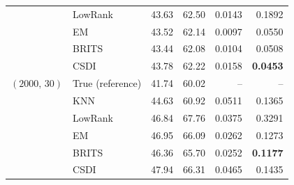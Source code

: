 \begin{table}[htbp]
\begin{tabular}{llrrrr}
     & LowRank & 43.63 & 62.50 & 0.0143 & 0.1892 \\
     & EM & 43.52 & 62.14 & 0.0097 & 0.0550 \\
     & BRITS & 43.44 & 62.08 & 0.0104 & 0.0508 \\
     & CSDI & 43.78 & 62.22 & 0.0158 & \textbf{0.0453} \\
    \midrule
    $(2000,\, 30)$ & True (reference) & 41.74 & 60.02 & -- & -- \\
     & KNN & 44.63 & 60.92 & 0.0511 & 0.1365 \\
     & LowRank & 46.84 & 67.76 & 0.0375 & 0.3291 \\
     & EM & 46.95 & 66.09 & 0.0262 & 0.1273 \\
     & BRITS & 46.36 & 65.70 & 0.0252 & \textbf{0.1177} \\
     & CSDI & 47.94 & 66.31 & 0.0465 & 0.1435 \\
    \bottomrule
  \end{tabular}
\end{table}

